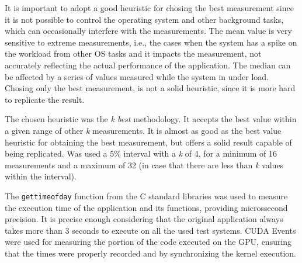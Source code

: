 It is important to adopt a good heuristic for chosing the best measurement since it is not possible to control the operating system and other background tasks, which can occasionally interfere with the measurements. The mean value is very sensitive to extreme measurements, i.e., the cases when the system has a spike on the workload from other OS tasks and it impacts the measurement, not accurately reflecting the actual performance of the application. The median can be affected by a series of values measured while the system in under load. Chosing only the best measurement, is not a solid heuristic, since it is more hard to replicate the result.

The chosen heuristic was the \textit{k best} methodology. It accepts the best value within a given range of other \textit{k} measurements. It is almost as good as the best value heuristic for obtaining the best measurement, but offers a solid result capable of being replicated. Was used a 5\% interval with a \textit{k} of 4, for a minimum of 16 measurements and a maximum of 32 (in case that there are less than \textit{k} values within the interval).

The \texttt{gettimeofday} function from the C standard libraries was used to measure the execution time of the application and its functions, providing microssecond precision. It is precise enough considering that the original application always takes more than 3 seconds to execute on all the used test systems. CUDA Events were used for measuring the portion of the code executed on the GPU, ensuring that the times were properly recorded and by synchronizing the kernel execution.
